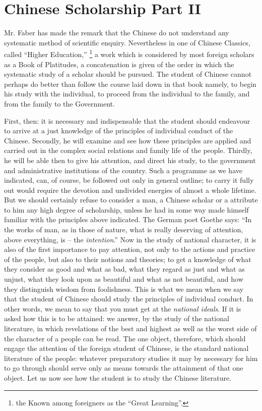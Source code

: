 
\chapter[Chinese Scholarship Part II]
{Chinese Scholarship Part II}

Mr. Faber has made the remark that the Chinese do not understand any systematic method of scientific enquiry.
Nevertheless in one of Chinese Classics,
called ``Higher Education,'' \footnote{the Known among foreigners as the ``Great Learning''.}
a work which is considered by most foreign scholars as a Book of Platitudes,
a concatenation is given of the order in which the systematic study of a scholar should be pursued.
The student of Chinese cannot perhaps do better than follow the course laid down in that book namely,
to begin his study with the individual,
to proceed from the individual to the family,
and from the family to the Government.

First, then: it is necessary and indispensable that the student should endeavour to arrive at a just knowledge of the principles of individual conduct of the Chinese.
Secondly, he will examine and see how these principles are applied and carried out in the complex social relations and family life of the people.
Thirdly, he will be able then to give his attention, and direct his study, to the government and administrative institutions of the country.
Such a programme as we have indicated, can, of course, be followed out only in general outline;
to carry it fully out would require the devotion and undivided energies of almost a whole lifetime.
But we should certainly refuse to consider a man,
a Chinese scholar or a attribute to him any high degree of scholarship,
unless he had in some way made himself familiar with the principles above indicated.
The German poet Goethe says:
``In the works of man, as in those of nature,
what is really deserving of attention, above everything, is -- the \emph{intention}.''
Now in the study of national character,
it is also of the first importance to pay attention,
not only to the actions and practice of the people,
but also to their notions and theories;
to get a knowledge of what they consider as good and what as bad, what they regard as just and what as unjust, what they look upon as beautiful and what as not beautiful, and how they distinguish wisdom from foolishness.
This is what we mean when we say that the student of Chinese should study the principles of individual conduct.
In other words, we mean to say that you must get at the \emph{national ideals}.
If it is asked how this is to be attained:
we answer, by the study of the national literature,
in which revelations of the best and highest as well as the worst side of the character of a people can be read.
The one object, therefore, which should engage the attention of the foreign student of Chinese,
is the standard national literature of the people:
whatever preparatory studies it may by necessary for him to go through should serve only as means towards the attainment of that one object.
Let us now see how the student is to study the Chinese literature.


